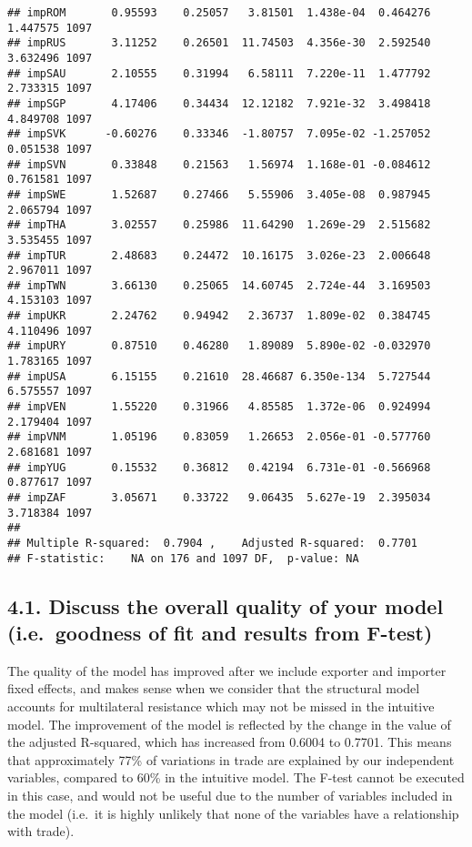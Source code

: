 \documentclass[
]{article}
\begin{document}
\begin{verbatim}
## impROM       0.95593    0.25057   3.81501  1.438e-04  0.464276  1.447575 1097
## impRUS       3.11252    0.26501  11.74503  4.356e-30  2.592540  3.632496 1097
## impSAU       2.10555    0.31994   6.58111  7.220e-11  1.477792  2.733315 1097
## impSGP       4.17406    0.34434  12.12182  7.921e-32  3.498418  4.849708 1097
## impSVK      -0.60276    0.33346  -1.80757  7.095e-02 -1.257052  0.051538 1097
## impSVN       0.33848    0.21563   1.56974  1.168e-01 -0.084612  0.761581 1097
## impSWE       1.52687    0.27466   5.55906  3.405e-08  0.987945  2.065794 1097
## impTHA       3.02557    0.25986  11.64290  1.269e-29  2.515682  3.535455 1097
## impTUR       2.48683    0.24472  10.16175  3.026e-23  2.006648  2.967011 1097
## impTWN       3.66130    0.25065  14.60745  2.724e-44  3.169503  4.153103 1097
## impUKR       2.24762    0.94942   2.36737  1.809e-02  0.384745  4.110496 1097
## impURY       0.87510    0.46280   1.89089  5.890e-02 -0.032970  1.783165 1097
## impUSA       6.15155    0.21610  28.46687 6.350e-134  5.727544  6.575557 1097
## impVEN       1.55220    0.31966   4.85585  1.372e-06  0.924994  2.179404 1097
## impVNM       1.05196    0.83059   1.26653  2.056e-01 -0.577760  2.681681 1097
## impYUG       0.15532    0.36812   0.42194  6.731e-01 -0.566968  0.877617 1097
## impZAF       3.05671    0.33722   9.06435  5.627e-19  2.395034  3.718384 1097
## 
## Multiple R-squared:  0.7904 ,    Adjusted R-squared:  0.7701 
## F-statistic:    NA on 176 and 1097 DF,  p-value: NA
\end{verbatim}

\hypertarget{discuss-the-overall-quality-of-your-model-i.e.-goodness-of-fit-and-results-from-f-test-1}{%
\subsection{4.1. Discuss the overall quality of your model
(i.e.~goodness of fit and results from
F-test)}\label{discuss-the-overall-quality-of-your-model-i.e.-goodness-of-fit-and-results-from-f-test-1}}

The quality of the model has improved after we include exporter and
importer fixed effects, and makes sense when we consider that the
structural model accounts for multilateral resistance which may not be
missed in the intuitive model. The improvement of the model is reflected
by the change in the value of the adjusted R-squared, which has
increased from 0.6004 to 0.7701. This means that approximately 77\% of
variations in trade are explained by our independent variables, compared
to 60\% in the intuitive model. The F-test cannot be executed in this
case, and would not be useful due to the number of variables included in
the model (i.e.~it is highly unlikely that none of the variables have a
relationship with trade).
\end{document}
